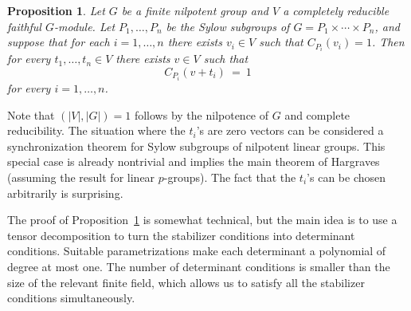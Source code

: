 \documentclass[11pt]{amsart}
\numberwithin{equation}{section}
\newtheorem{proposition}[theorem]{Proposition}
\theoremstyle{definition}
\theoremstyle{remark}
\begin{document}
\begin{proposition} \label{prop:translated}
Let $G$ be a finite nilpotent group and $V$ a completely reducible
faithful $G$-module.
Let $P_1,\ldots,P_n$ be the Sylow subgroups of $G=P_1\times\cdots\times P_n$,
and suppose that for each $i = 1,\ldots,n$ there exists $v_i \in V$ such that $C_{P_i}(v_i) = 1$.
Then for every $t_1,\ldots,t_n \in V$ there exists
$v\in V$ such that 
$$ C_{P_i}(v + t_i) \> = \> 1 $$
for every $i=1,\ldots,n$.
\end{proposition}

Note that $(|V|,|G|)=1$ follows by the nilpotence of $G$ and complete reducibility.
The situation where the $t_i$'s are zero vectors can be considered
a synchronization theorem for Sylow subgroups of nilpotent linear groups.
This special case is already nontrivial and implies the main theorem of Hargraves \cite{Har81} (assuming the result for linear $p$-groups).
The fact that the $t_i$'s can be chosen arbitrarily is surprising.

The proof of Proposition~\ref{prop:translated} is somewhat technical,
but the main idea is to use a tensor decomposition
to turn the stabilizer conditions into determinant conditions.
Suitable parametrizations make each determinant a polynomial of degree at most one.
The number of determinant conditions is smaller than the size of the relevant finite field,
which allows us to satisfy all the stabilizer conditions simultaneously.
\end{document}
